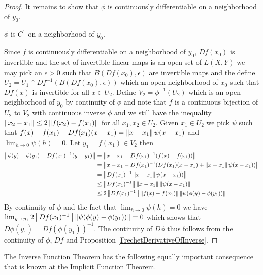 \begin{proof}
It remains to show that $\phi$ is continuously differentiable on a neighborhood of $y_0$.
\begin{clm}$\phi$ is $C^1$ on a neighborhood of $y_0$.
\end{clm}
Since $f$ is continuously differentiable on a neighborhood of $y_0$, $Df(x_0)$ is invertible and the set of invertible linear maps is an open set of $L(X,Y)$ we may pick an $\epsilon>0$ such that $B(Df(x_0), \epsilon)$ are invertible maps and the define $U_2 = U_1 \cap Df^{-1}(B(Df(x_0), \epsilon))$ which an open neighborhood of $x_0$ such that $Df(x)$ is invertible for all $x \in U_2$.  Define $V_2 = \phi^{-1}(U_2)$ which is an open neighborhood of $y_0$ by continuity of $\phi$ and note that $f$ is a continuous bijection of $U_2$ to $V_2$ with continuous inverse $\phi$ and we still have the inequality $\left \lVert x_2 - x_1 \right \rVert \leq 2 \left \lVert f(x_2) - f(x_1) \right \rVert$ for all $x_1, x_2 \in U_2$.  Given $x_1\in U_2$ we pick $\psi$ such that $f(x) - f(x_1) - Df(x_1) (x - x_1) = \left \lVert x - x_1 \right \rVert \psi(x - x_1)$ and $\lim_{h \to 0} \psi(h) = 0$.  Let $y_1 = f(x_1) \in V_2$ then
\begin{align*}
\left \lVert \phi(y) - \phi(y_1) - Df(x_1)^{-1} (y - y_1) \right \rVert &= \left \lVert x - x_1 - Df(x_1)^{-1} (f(x) - f(x_1)) \right \rVert \\
&= \left \lVert x - x_1 - Df(x_1)^{-1} (Df(x_1) (x - x_1) + \left \lVert x-x_1 \right \rVert \psi(x-x_1)) \right \rVert\\
&= \left \lVert Df(x_1)^{-1} \left \lVert x-x_1 \right \rVert \psi(x-x_1)) \right \rVert\\
&\leq \left \lVert Df(x_1)^{-1} \right \rVert \left \lVert x-x_1 \right \rVert \left \lVert \psi(x-x_1) \right \rVert \\
&\leq 2 \left \lVert Df(x_1)^{-1} \right \rVert \left \lVert f(x) - f(x_1)  \right \rVert \left \lVert \psi(\phi(y) -\phi(y_1)) \right \rVert \\
\end{align*}
By continuity of $\phi$ and the fact that $\lim_{h \to 0} \psi(h) = 0$ we have $\lim_{y \to y_1} 2 \left \lVert Df(x_1)^{-1} \right \rVert \left \lVert \psi(\phi(y) -\phi(y_1)) \right \rVert = 0$ which shows that $D\phi(y_1) = Df(\phi(y_1))^{-1}$.  The continuity of $D\phi$ thus follows from the continuity of $\phi$, $Df$ and Proposition \ref{FrechetDerivativeOfInverse}.
\end{proof}

The Inverse Function Theorem has the following equally important
consequence that is known at the Implicit Function Theorem.

